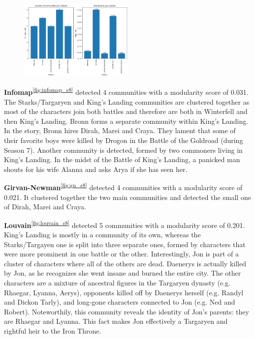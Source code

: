 \documentclass[10pt,twocolumn,letterpaper]{article}
\begin{document}
\begin{figure}[!h]
    \centering
    \includegraphics[width=0.5\textwidth]{img/s8/communities_comparison.jpg}
\end{figure}

\textbf{Infomap}\textsuperscript{\ref{fig:infomap_s8}} detected 4 communities with a modularity score of 0.031. The Starks/Targaryen and King's Landing communities are clustered together as most of the characters join both battles and therefore are both in Winterfell and then King's Landing. Bronn forms a separate community within King's Landing. In the story, Bronn hires Dirah, Marei and Craya. They lament that some of their favorite boys were killed by Drogon in the Battle of the Goldroad (during Season 7).
Another community is detected, formed by two commoners living in King's Landing. In the midst of the Battle of King's Landing, a panicked man shouts for his wife Alanna and asks Arya if she has seen her.

\textbf{Girvan-Newman}\textsuperscript{\ref{fig:gn_s8}} detected 4 communities with a modularity score of 0.021. It clustered together the two main communities and detected the small one of Dirah, Marei and Craya. 

\textbf{Louvain}\textsuperscript{\ref{fig:louvain_s8}} detected 5 communities with a modularity score of 0.201. King's Landing is mostly in a community of its own, whereas the Starks/Targayen one is split into three separate ones, formed by characters that were more prominent in one battle or the other. Interestingly, Jon is part of a cluster of characters where all of the others are dead. Daenerys is actually killed by Jon, as he recognizes she went insane and burned the entire city. The other characters are a mixture of ancestral figures in the Targaryen dynasty (e.g. Rhaegar, Lyanna, Aerys), opponents killed off by Daenerys herself (e.g. Randyl and Dickon Tarly), and long-gone characters connected to Jon (e.g. Ned and Robert). Noteworthily, this community reveals the identity of Jon's parents: they are Rhaegar and Lyanna. This fact makes Jon effectively a Targaryen and rightful heir to the Iron Throne. 
\end{document}
